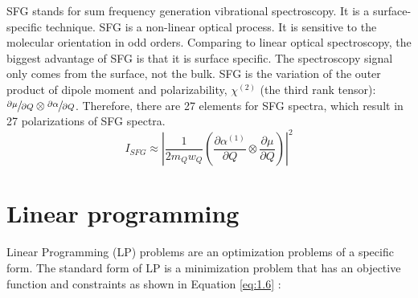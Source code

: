SFG stands for sum frequency generation vibrational spectroscopy. It is a surface-specific technique. SFG is a non-linear optical process. It is sensitive to the molecular orientation in odd orders. Comparing to linear optical spectroscopy, the biggest advantage of SFG is that it is surface specific. The spectroscopy signal only comes from the surface, not the bulk. SFG is the variation of the outer product of dipole moment and polarizability, $\chi^{(2)}$ (the third rank tensor): $\sfrac{\partial\mu}{\partial Q} \otimes \sfrac{\partial\alpha}{\partial Q} $. Therefore, there are 27 elements for SFG spectra, which result in 27 polarizations of SFG spectra. \\

\begin{equation} \label{eq:1.5}
I_{SFG} \approx \left| \frac{1}{2m_{Q}w_{Q}} \left( \frac{\partial\alpha^{(1)}}{\partial Q} \otimes \frac{\partial\mu}{\partial Q} \right) \right|^{2}
\end{equation}



\section{Linear programming}
Linear Programming (LP) problems are an optimization problems of a specific form. The standard form of LP is a minimization problem that has an objective function and constraints as shown in Equation \ref{eq:1.6} \cite{UULP}:

